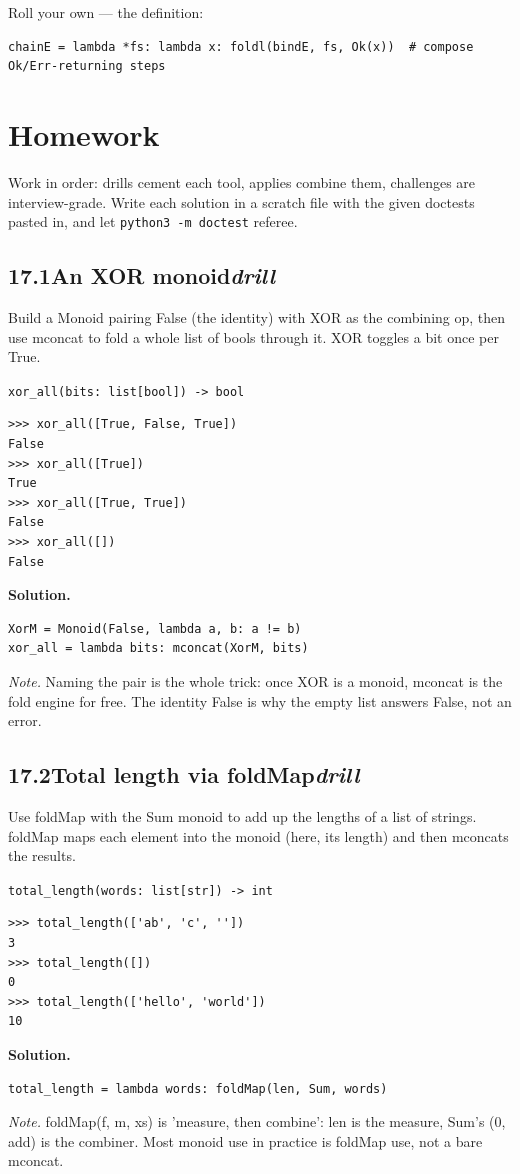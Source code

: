 \documentclass[10pt,letterpaper]{book}
\begin{document}
Roll your own --- the definition:

\begin{lstlisting}[style=ex]
chainE = lambda *fs: lambda x: foldl(bindE, fs, Ok(x))  # compose Ok/Err-returning steps
\end{lstlisting}
\section{Homework}
Work in order: drills cement each tool, applies combine them,
challenges are interview-grade. Write each solution in a scratch file with
the given doctests pasted in, and let \texttt{python3 -m doctest} referee.
\subsection*{17.1\quad An XOR monoid\hfill\textnormal{\textit{drill}}}
Build a Monoid pairing False (the identity) with XOR as the combining op, then use mconcat to fold a whole list of bools through it. XOR toggles a bit once per True.

\noindent\texttt{xor\_all(bits: list[bool]) -> bool}
\begin{lstlisting}[style=ex]
>>> xor_all([True, False, True])
False
>>> xor_all([True])
True
>>> xor_all([True, True])
False
>>> xor_all([])
False
\end{lstlisting}
\noindent\textbf{Solution.}
\begin{lstlisting}[style=code]
XorM = Monoid(False, lambda a, b: a != b)
xor_all = lambda bits: mconcat(XorM, bits)
\end{lstlisting}
\noindent\textit{Note.} Naming the pair is the whole trick: once XOR is a monoid, mconcat is the fold engine for free. The identity False is why the empty list answers False, not an error.

\subsection*{17.2\quad Total length via foldMap\hfill\textnormal{\textit{drill}}}
Use foldMap with the Sum monoid to add up the lengths of a list of strings. foldMap maps each element into the monoid (here, its length) and then mconcats the results.

\noindent\texttt{total\_length(words: list[str]) -> int}
\begin{lstlisting}[style=ex]
>>> total_length(['ab', 'c', ''])
3
>>> total_length([])
0
>>> total_length(['hello', 'world'])
10
\end{lstlisting}
\noindent\textbf{Solution.}
\begin{lstlisting}[style=code]
total_length = lambda words: foldMap(len, Sum, words)
\end{lstlisting}
\noindent\textit{Note.} foldMap(f, m, xs) is 'measure, then combine': len is the measure, Sum's (0, add) is the combiner. Most monoid use in practice is foldMap use, not a bare mconcat.
\end{document}
